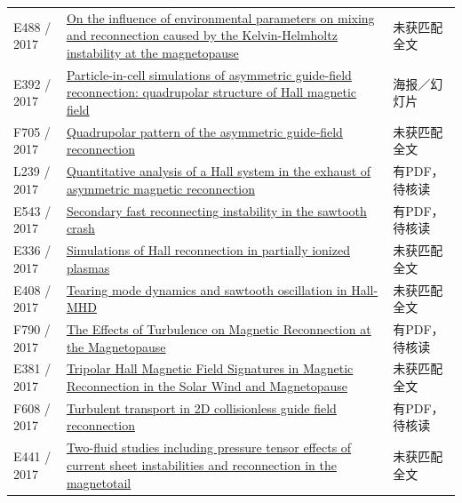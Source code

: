 \begin{longtable}{P{24mm}P{97mm}P{27mm}}
E488 / 2017 & \href{https://doi.org/10.1063/1.4974758}{On the influence of environmental parameters on mixing and reconnection caused by the Kelvin-Helmholtz instability at the magnetopause} & 未获匹配全文\\

E392 / 2017 & \href{http://urlib.net/sid.inpe.br/mtc-m21b/2017/12.21.17.31}{Particle-in-cell simulations of asymmetric guide-field reconnection: quadrupolar structure of Hall magnetic field} & 海报／幻灯片\\

F705 / 2017 & \href{https://doi.org/10.1002/2016ja023666}{Quadrupolar pattern of the asymmetric guide‐field reconnection} & 未获匹配全文\\

L239 / 2017 & \href{https://doi.org/10.1002/2016ja023620}{Quantitative analysis of a Hall system in the exhaust of asymmetric magnetic reconnection} & 有PDF，待核读\\

E543 / 2017 & \href{https://doi.org/10.1063/1.4973328}{Secondary fast reconnecting instability in the sawtooth crash} & 有PDF，待核读\\

E336 / 2017 & \href{http://ui.adsabs.harvard.edu/abs/2017EGUGA..1915103I/abstract}{Simulations of Hall reconnection in partially ionized plasmas} & 未获匹配全文\\

E408 / 2017 & \href{http://absimage.aps.org/image/DPP17/MWS_DPP17-2017-000073.pdf}{Tearing mode dynamics and sawtooth oscillation in Hall-MHD} & 未获匹配全文\\

F790 / 2017 & \href{https://doi.org/10.13016/m24q7qq78}{The Effects of Turbulence on Magnetic Reconnection at the Magnetopause} & 有PDF，待核读\\

E381 / 2017 & \href{https://ui.adsabs.harvard.edu/abs/2017shin.confE..42C/abstract}{Tripolar Hall Magnetic Field Signatures in Magnetic Reconnection in the Solar Wind and Magnetopause} & 未获匹配全文\\

F608 / 2017 & \href{https://doi.org/10.1063/1.4975086}{Turbulent transport in 2D collisionless guide field reconnection} & 有PDF，待核读\\

E441 / 2017 & \href{https://ui.adsabs.harvard.edu/abs/2017AGUFMSM11C2328N/abstract}{Two-fluid studies including pressure tensor effects of current sheet instabilities and reconnection in the magnetotail} & 未获匹配全文\\


\end{longtable}
